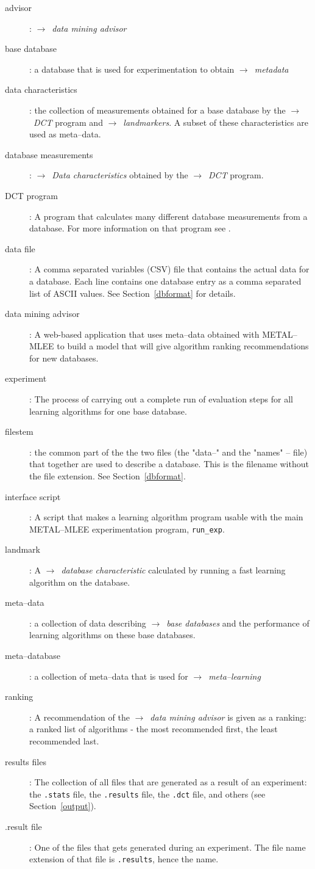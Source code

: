 \documentclass[a4paper,10pt,twoside]{article}
\newcommand{\eenameshort}{\textsf{METAL--MLEE}}
\newcommand{\see}[1]{$\rightarrow$~\emph{#1}}
\begin{document}
\begin{description}
\item[advisor]: \see{data mining advisor}
\item[base database]: a database that is used for experimentation
  to obtain \see{metadata}
\item[data characteristics]: the collection of measurements  obtained
for a base database by the \see{DCT} program and \see{landmarkers}.
 A subset of these
characteristics are used as meta--data. 
\item[database measurements]: \see{Data characteristics} obtained by the 
\see{DCT} program.
\item[DCT program]: A program that calculates many different database
measurements from a database. For more information on that program
see \cite{dct}.
\item[data file]: A comma separated variables (CSV) file that
contains the actual data for a database. Each line contains
one database entry as a comma separated list of ASCII values.
See Section~\ref{dbformat} for details.
\item[data mining advisor]: A web-based application that uses 
meta--data obtained with \eenameshort{} to build a model that will
give algorithm ranking recommendations for new databases.
\item[experiment]: The process of carrying out a complete run of 
evaluation steps for all learning algorithms for one base database.
\item[filestem]: the common part of the the two files (the "data--"
and the "names" -- file) that together are used to describe a 
database. This is the filename without the file extension.
See Section~\ref{dbformat}.
\item[interface script]: A script that makes a learning algorithm program
usable with the main \eenameshort{} experimentation program, \verb=run_exp=.
\item[landmark]: A \see{database characteristic} calculated by running 
a fast learning algorithm on the database.
\item[meta--data]: a collection of data describing \see{base databases} and
the performance of learning algorithms on these base databases.
\item[meta--database]: a collection of meta--data that is used for
  \see{meta--learning}
\item[ranking]: A recommendation of the \see{data mining advisor} is
given as a ranking: 
 a ranked list of algorithms - the most recommended first,
the least recommended last.
\item[results files]: The collection of all files that are generated
as a result of an experiment: the \texttt{.stats} file, the 
\texttt{.results} file, the \texttt{.dct} file, and others 
(see Section~\ref{output}).
\item[.result file]: One of the files that gets generated during an
experiment. The file name extension of that file is \texttt{.results},
hence the name.
\end{description}
\end{document}
